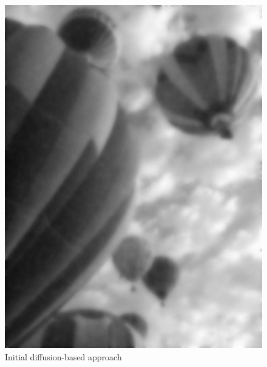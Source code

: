 \begin{figure}
\begin{minipage}[b]{.47\linewidth}
\centering
\includegraphics[width=\textwidth]{diffusion_denoised_baloons_resized_bw.jpg}
\caption*{Initial diffusion-based approach}
\end{minipage}
\hspace{0.5cm}
\begin{minipage}[b]{0.47\linewidth}
\centering

\end{minipage}
\end{figure}
